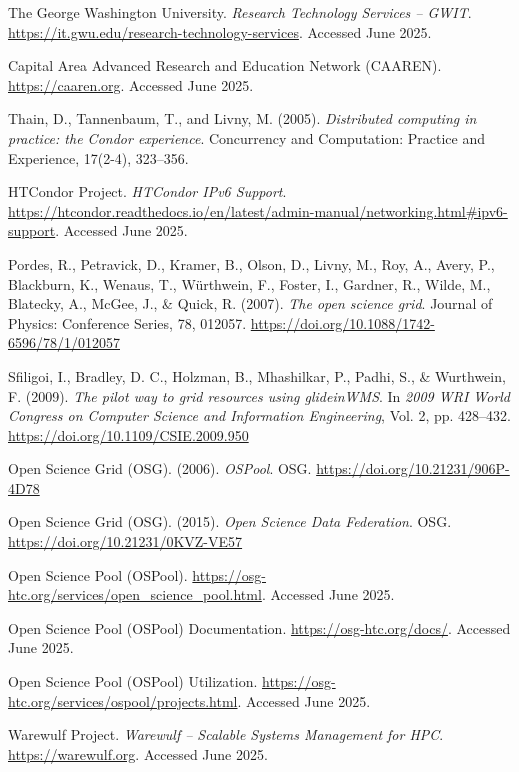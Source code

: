 \documentclass[11pt]{article}
\begin{document}
\begin{thebibliography}{99}
The George Washington University. \textit{Research Technology Services – GWIT}. \url{https://it.gwu.edu/research-technology-services}. Accessed June 2025.

Capital Area Advanced Research and Education Network (CAAREN). \url{https://caaren.org}. Accessed June 2025.

Thain, D., Tannenbaum, T., and Livny, M. (2005). \textit{Distributed computing in practice: the Condor experience}. Concurrency and Computation: Practice and Experience, 17(2-4), 323–356.

HTCondor Project. \textit{HTCondor IPv6 Support}. \url{https://htcondor.readthedocs.io/en/latest/admin-manual/networking.html#ipv6-support}. Accessed June 2025.

Pordes, R., Petravick, D., Kramer, B., Olson, D., Livny, M., Roy, A., Avery, P., Blackburn, K., Wenaus, T., Würthwein, F., Foster, I., Gardner, R., Wilde, M., Blatecky, A., McGee, J., \& Quick, R. (2007). \textit{The open science grid}. Journal of Physics: Conference Series, 78, 012057. \url{https://doi.org/10.1088/1742-6596/78/1/012057}

Sfiligoi, I., Bradley, D. C., Holzman, B., Mhashilkar, P., Padhi, S., \& Wurthwein, F. (2009). \textit{The pilot way to grid resources using glideinWMS}. In \textit{2009 WRI World Congress on Computer Science and Information Engineering}, Vol. 2, pp. 428–432. \url{https://doi.org/10.1109/CSIE.2009.950}

Open Science Grid (OSG). (2006). \textit{OSPool}. OSG. \url{https://doi.org/10.21231/906P-4D78}

Open Science Grid (OSG). (2015). \textit{Open Science Data Federation}. OSG. \url{https://doi.org/10.21231/0KVZ-VE57}

Open Science Pool (OSPool). \url{https://osg-htc.org/services/open_science_pool.html}. Accessed June 2025.


Open Science Pool (OSPool) Documentation. \url{https://osg-htc.org/docs/}. Accessed June 2025.

Open Science Pool (OSPool) Utilization. \url{https://osg-htc.org/services/ospool/projects.html}. Accessed June 2025.

Warewulf Project. \textit{Warewulf – Scalable Systems Management for HPC}. \url{https://warewulf.org}. Accessed June 2025.


\end{thebibliography}
\end{document}
